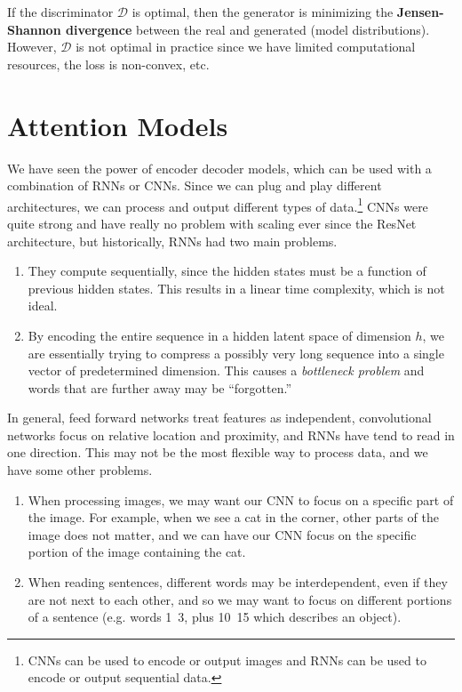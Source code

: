 \documentclass{article}
\begin{document}
  If the discriminator $\mathcal{D}$ is optimal, then the generator is minimizing the \textbf{Jensen-Shannon divergence} between the real and generated (model distributions). However, $\mathcal{D}$ is not optimal in practice since we have limited computational resources, the loss is non-convex, etc. 

\section{Attention Models}

  We have seen the power of encoder decoder models, which can be used with a combination of RNNs or CNNs. Since we can plug and play different architectures, we can process and output different types of data.\footnote{CNNs can be used to encode or output images and RNNs can be used to encode or output sequential data.} CNNs were quite strong and have really no problem with scaling ever since the ResNet architecture, but historically, RNNs had two main problems. 
  \begin{enumerate} 
    \item They compute sequentially, since the hidden states must be a function of previous hidden states. This results in a linear time complexity, which is not ideal. 
    \item By encoding the entire sequence in a hidden latent space of dimension $h$, we are essentially trying to compress a possibly very long sequence into a single vector of predetermined dimension. This causes a \textit{bottleneck problem} and words that are further away may be ``forgotten.''
  \end{enumerate}

  In general, feed forward networks treat features as independent, convolutional networks focus on relative location and proximity, and RNNs have tend to read in one direction. This may not be the most flexible way to process data, and we have some other problems. 
  \begin{enumerate}
      \item When processing images, we may want our CNN to focus on a specific part of the image. For example, when we see a cat in the corner, other parts of the image does not matter, and we can have our CNN focus on the specific portion of the image containing the cat. 
      \item When reading sentences, different words may be interdependent, even if they are not next to each other, and so we may want to focus on different portions of a sentence (e.g. words 1~3, plus 10~15 which describes an object). 
  \end{enumerate}
\end{document}
